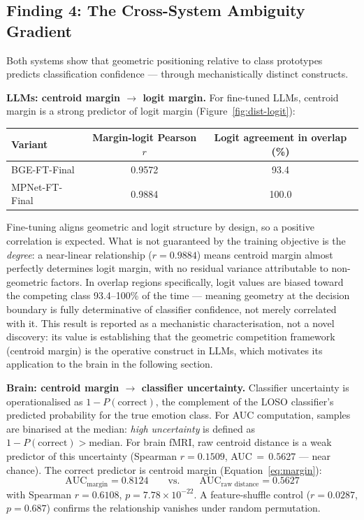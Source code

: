 \documentclass{article}
\begin{document}
\subsection{Finding 4: The Cross-System Ambiguity Gradient}
\label{sec:finding4}

Both systems show that geometric positioning relative to class prototypes predicts
classification confidence --- through mechanistically distinct constructs.

\textbf{LLMs: centroid margin $\to$ logit margin.}
For fine-tuned LLMs, centroid margin is a strong predictor of logit margin
(Figure~\ref{fig:dist-logit}):

\begin{center}
\small
\begin{tabular}{lcc}
\toprule
Variant & Margin-logit Pearson $r$ & Logit agreement in overlap (\%) \\
\midrule
BGE-FT-Final    & 0.9572 & 93.4  \\
MPNet-FT-Final  & 0.9884 & 100.0 \\
\bottomrule
\end{tabular}
\end{center}

Fine-tuning aligns geometric and logit structure by design, so a positive correlation
is expected.
What is not guaranteed by the training objective is the \emph{degree}: a near-linear
relationship ($r\!=\!0.9884$) means centroid margin almost perfectly determines logit
margin, with no residual variance attributable to non-geometric factors.
In overlap regions specifically, logit values are biased toward the competing class
93.4--100\% of the time --- meaning geometry at the decision boundary is fully
determinative of classifier confidence, not merely correlated with it.
This result is reported as a mechanistic characterisation, not a novel discovery:
its value is establishing that the geometric competition framework (centroid margin)
is the operative construct in LLMs, which motivates its application to the brain in
the following section.

\textbf{Brain: centroid margin $\to$ classifier uncertainty.}
Classifier uncertainty is operationalised as $1 - P(\text{correct})$, the complement
of the LOSO classifier's predicted probability for the true emotion class.
For AUC computation, samples are binarised at the median: \emph{high uncertainty} is
defined as $1 - P(\text{correct}) > \text{median}$.
For brain fMRI, raw centroid distance is a weak predictor of this uncertainty
(Spearman $r\!=\!0.1509$, AUC$\,{=}\,0.5627$ --- near chance).
The correct predictor is centroid margin (Equation~\ref{eq:margin}):
\begin{equation*}
  \text{AUC}_{\text{margin}} = 0.8124
  \qquad\text{vs.}\qquad
  \text{AUC}_{\text{raw distance}} = 0.5627
\end{equation*}
with Spearman $r\!=\!0.6108$, $p\!=\!7.78\!\times\!10^{-22}$.
A feature-shuffle control ($r\!=\!0.0287$, $p\!=\!0.687$) confirms the relationship
vanishes under random permutation.
\end{document}
